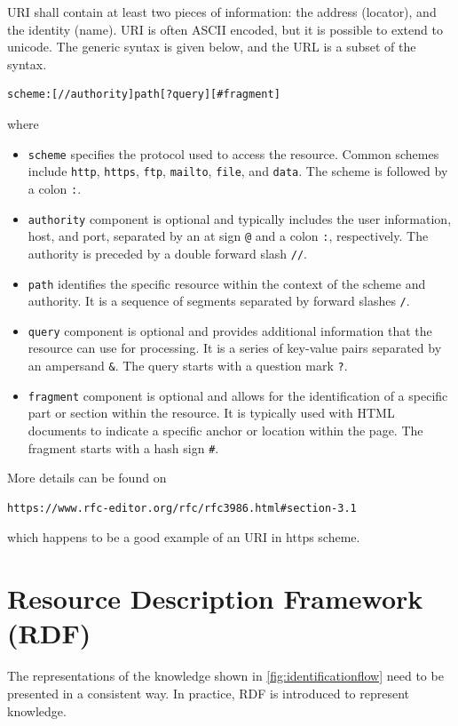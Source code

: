 URI shall contain at least two pieces of information: the address (locator), and the identity (name). URI is often ASCII encoded, but it is possible to extend to unicode. The generic syntax is given below, and the URL is a subset of the syntax.
\begin{lstlisting}
scheme:[//authority]path[?query][#fragment]
\end{lstlisting}
where
\begin{itemize}
\item \verb|scheme| specifies the protocol used to access the resource. Common schemes include \verb|http|, \verb|https|, \verb|ftp|, \verb|mailto|, \verb|file|, and \verb|data|. The scheme is followed by a colon \verb|:|.
\item \verb|authority| component is optional and typically includes the user information, host, and port, separated by an at sign \verb|@| and a colon \verb|:|, respectively. The authority is preceded by a double forward slash \verb|//|.
\item \verb|path| identifies the specific resource within the context of the scheme and authority. It is a sequence of segments separated by forward slashes \verb|/|.
\item \verb|query| component is optional and provides additional information that the resource can use for processing. It is a series of key-value pairs separated by an ampersand \verb|&|. The query starts with a question mark \verb|?|.
\item \verb|fragment| component is optional and allows for the identification of a specific part or section within the resource. It is typically used with HTML documents to indicate a specific anchor or location within the page. The fragment starts with a hash sign \verb|#|.
\end{itemize}
More details can be found on
\begin{lstlisting}
https://www.rfc-editor.org/rfc/rfc3986.html#section-3.1
\end{lstlisting}
which happens to be a good example of an URI in https scheme.

\section{Resource Description Framework (RDF)}

The representations of the knowledge shown in \ref{fig:identificationflow} need to be presented in a consistent way. In practice, RDF is introduced to represent knowledge.

